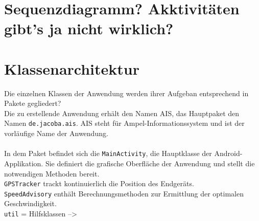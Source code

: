 \section{Sequenzdiagramm? Akktivitäten gibt's ja nicht wirklich?}
\section{Klassenarchitektur}
Die einzelnen Klassen der Anwendung werden ihrer Aufgeban entsprechend in Pakete gegliedert?\\
Die zu erstellende Anwendung erhält den Namen AIS, das Hauptpaket den Namen \texttt{de.jacoba.ais}. AIS steht für Ampel-Informationssystem und ist der vorläufige Name der Anwendung. \\\\
In dem Paket befindet sich die \texttt{MainActivity}, die Hauptklasse der Android-Applikation. Sie definiert die grafische Oberfläche der Anwendung und stellt die notwendigen Methoden bereit. \\
\texttt{GPSTracker} trackt kontinuierlich die Position des Endgeräts.\\
\texttt{SpeedAdvisory} enthält Berechnungsmethoden zur Ermittlung der optimalen Geschwindigkeit.\\
 \texttt{util} = Hilfsklassen -->
